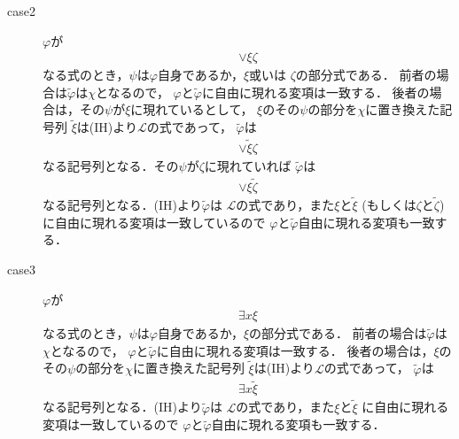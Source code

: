 \begin{metaprf}
\begin{description}
\begin{description}
					\item[case2] $\varphi$が
						\begin{align}
							\vee \xi \zeta
						\end{align}
						なる式のとき，$\psi$は$\varphi$自身であるか，$\xi$或いは
						$\zeta$の部分式である．
						前者の場合は$\widetilde{\varphi}$は$\chi$となるので，
						$\varphi$と$\widetilde{\varphi}$に自由に現れる変項は一致する．
						後者の場合は，その$\psi$が$\xi$に現れているとして，
						$\xi$のその$\psi$の部分を$\chi$に置き換えた記号列
						$\widetilde{\xi}$は(IH)より$\mathcal{L}$の式であって，
						$\widetilde{\varphi}$は
						\begin{align}
							\vee \widetilde{\xi} \zeta
						\end{align}
						なる記号列となる．その$\psi$が$\zeta$に現れていれば
						$\widetilde{\varphi}$は
						\begin{align}
							\vee \xi \widetilde{\zeta}
						\end{align}
						なる記号列となる．(IH)より$\widetilde{\varphi}$は
						$\mathcal{L}$の式であり，また$\xi$と$\widetilde{\xi}$
						(もしくは$\zeta$と$\widetilde{\zeta}$)
						に自由に現れる変項は一致しているので
						$\varphi$と$\widetilde{\varphi}$自由に現れる変項も一致する．
						
					\item[case3] $\varphi$が
						\begin{align}
							\exists x \xi
						\end{align}
						なる式のとき，$\psi$は$\varphi$自身であるか，$\xi$の部分式である．
						前者の場合は$\widetilde{\varphi}$は$\chi$となるので，
						$\varphi$と$\widetilde{\varphi}$に自由に現れる変項は一致する．
						後者の場合は，$\xi$のその$\psi$の部分を$\chi$に置き換えた記号列
						$\widetilde{\xi}$は(IH)より$\mathcal{L}$の式であって，
						$\widetilde{\varphi}$は
						\begin{align}
							\exists x \widetilde{\xi}
						\end{align}
						なる記号列となる．(IH)より$\widetilde{\varphi}$は
						$\mathcal{L}$の式であり，また$\xi$と$\widetilde{\xi}$
						に自由に現れる変項は一致しているので
						$\varphi$と$\widetilde{\varphi}$自由に現れる変項も一致する．
						\QED
				\end{description}
		\end{description}
	\end{metaprf}